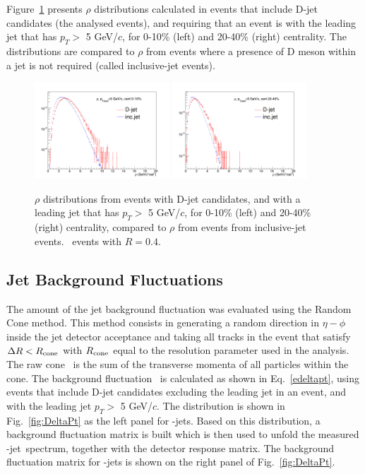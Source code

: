 Figure~\ref{fig:rho_Dstar} presents $\rho$ distributions calculated in events that include D-jet candidates (the analysed events), and requiring that an event is with the leading jet that has $p_{T}>$ 5 GeV/$c$, for 0-10\% (left) and 20-40\% (right) centrality. The distributions are compared to $\rho$ from events where a presence of D meson within a jet is not required (called inclusive-jet events).

\begin{figure}[bth]
\centering
\includegraphics[width=0.45\textwidth]{pPbplots/ResponseMatrix/hRho_ptleadbin5_cent0_10}
\includegraphics[width=0.45\textwidth]{pPbplots/ResponseMatrix/hRho_ptleadbin5_cent20_40}
\caption{$\rho$ distributions from events with D-jet candidates, and with a leading jet that has $p_{T}>$ 5 GeV/$c$, for 0-10\% (left) and 20-40\% (right) centrality, compared to $\rho$ from events from inclusive-jet events. \pPb\ events with $R=0.4$.}
\label{fig:rho_Dstar}
\end{figure}

\subsection{Jet Background Fluctuations}
\label{sBackFluc}
The amount of the jet background fluctuation was evaluated using the Random Cone method.
This method consists in generating a random direction in $\eta-\phi$ inside the jet detector acceptance and 
taking all tracks in the event that satisfy $\Delta R<R_{\rm cone}$ with $R_{\rm cone}$ equal to the resolution parameter used in the analysis. 
The raw cone \pt\ is the sum of the transverse momenta of all particles within the cone.
The background fluctuation \deltapt\ is calculated as shown in Eq.~\ref{edeltapt}, using events that include D-jet candidates excluding the leading jet in an event, 
and with the leading jet $p_{T}>$ 5 GeV/$c$. The distribution is shown in Fig.~\ref{fig:DeltaPt} as the left panel for \Dstar-jets. 
Based on this distribution, a background fluctuation matrix is built which is then used to unfold the measured \Dstar-jet\ \pt spectrum, together with the detector response matrix. 
The background fluctuation matrix for \Dstar-jets is shown on the right panel of Fig.~\ref{fig:DeltaPt}.

